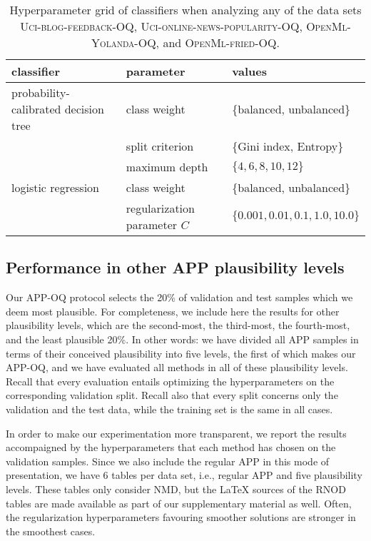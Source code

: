 \documentclass[10pt,a4paper]{article}
\begin{document}
\begin{table}
 \centering
 \caption{Hyperparameter grid of classifiers when analyzing any of
 the data sets \textsc{Uci-blog-feedback-OQ},
 \textsc{Uci-online-news-popularity-OQ}, \textsc{OpenMl-Yolanda-OQ},
 and \textsc{OpenMl-fried-OQ}.}
 \label{tab:hyperparameter-others}
 \footnotesize
 \begin{tabular}{lll}
 \toprule
 classifier & parameter & values \\
 \midrule
 probability-calibrated decision tree & class weight & \{balanced, unbalanced\} \\
 & split criterion & \{Gini index, Entropy\} \\
 & maximum depth & $\{4, 6, 8, 10, 12\}$ \\
 logistic regression & class weight & \{balanced, unbalanced\} \\
 & regularization parameter $C$ & $\{0.001, 0.01, 0.1, 1.0, 10.0\}$ \\
 \bottomrule
 \end{tabular}
\end{table}


\subsection{Performance in other APP plausibility levels}

\noindent Our APP-OQ protocol selects the 20\% of validation and test
samples which we deem most plausible. For completeness, we include
here the results for other plausibility levels, which are the
second-most, the third-most, the fourth-most, and the least plausible
20\%. In other words: we have divided all APP samples in terms of
their conceived plausibility into five levels, the first of which
makes our APP-OQ, and we have evaluated all methods in all of these
plausibility levels. Recall that every evaluation entails optimizing the hyperparameters on the corresponding validation split. Recall also that every split concerns only the validation and the test data, while the training set is the same in all cases.

In order to make our experimentation more transparent, we report the results accompaigned by the hyperparameters
that each method has chosen on the validation samples. Since we also
include the regular APP in this mode of presentation, we have 6 tables
per data set, i.e., regular APP and five plausibility levels. These
tables only consider NMD, but the LaTeX sources of the RNOD tables are made available as part of our supplementary material as well.
Often, the regularization hyperparameters favouring smoother solutions are stronger in the smoothest cases. 
\end{document}
